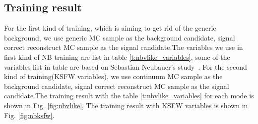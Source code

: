 \subsection{Training result} 
For the first kind of training, which is aiming to get rid of the generic background, we use generic MC sample as the background candidate, signal correct reconstruct MC sample as the signal candidate.The variables we use in first kind of NB training are list in table \ref{t:nbvlike_variables}, some of the variables list in table are based on Sebastian Neubauer's study~\cite{ref:Neubauer2011}. For the second kind of training(KSFW variables), we use continuum MC sample as the background candidate, signal correct reconstruct MC sample as the signal candidate.The training result with the table \ref{t:nbvlike_variables} for each mode is shown in Fig. \ref{fig:nbvlike}, The training result with KSFW variables is shown in Fig. \ref{fig:nbksfw}.
